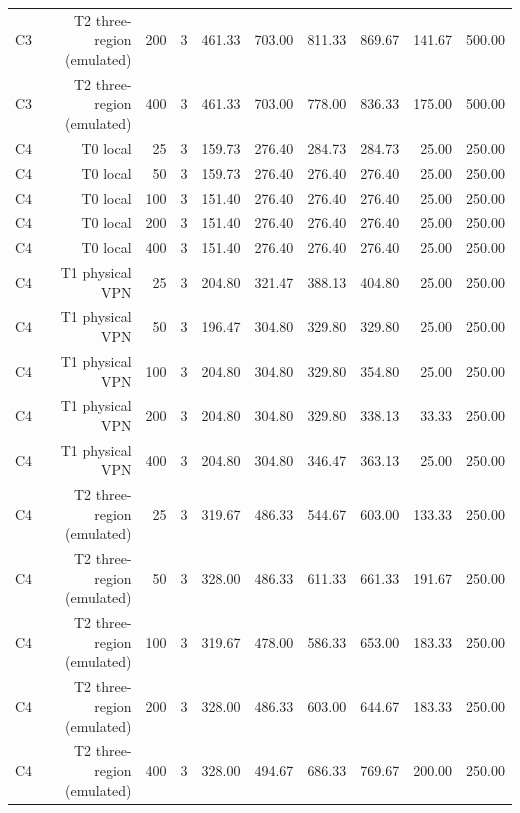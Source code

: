 \begin{table}[t]
\begin{tabular}{lrrrrrrrrr}
C3 & T2 three-region (emulated) & 200 & 3 & 461.33 & 703.00 & 811.33 & 869.67 & 141.67 & 500.00 \\
C3 & T2 three-region (emulated) & 400 & 3 & 461.33 & 703.00 & 778.00 & 836.33 & 175.00 & 500.00 \\
C4 & T0 local & 25 & 3 & 159.73 & 276.40 & 284.73 & 284.73 & 25.00 & 250.00 \\
C4 & T0 local & 50 & 3 & 159.73 & 276.40 & 276.40 & 276.40 & 25.00 & 250.00 \\
C4 & T0 local & 100 & 3 & 151.40 & 276.40 & 276.40 & 276.40 & 25.00 & 250.00 \\
C4 & T0 local & 200 & 3 & 151.40 & 276.40 & 276.40 & 276.40 & 25.00 & 250.00 \\
C4 & T0 local & 400 & 3 & 151.40 & 276.40 & 276.40 & 276.40 & 25.00 & 250.00 \\
C4 & T1 physical VPN & 25 & 3 & 204.80 & 321.47 & 388.13 & 404.80 & 25.00 & 250.00 \\
C4 & T1 physical VPN & 50 & 3 & 196.47 & 304.80 & 329.80 & 329.80 & 25.00 & 250.00 \\
C4 & T1 physical VPN & 100 & 3 & 204.80 & 304.80 & 329.80 & 354.80 & 25.00 & 250.00 \\
C4 & T1 physical VPN & 200 & 3 & 204.80 & 304.80 & 329.80 & 338.13 & 33.33 & 250.00 \\
C4 & T1 physical VPN & 400 & 3 & 204.80 & 304.80 & 346.47 & 363.13 & 25.00 & 250.00 \\
C4 & T2 three-region (emulated) & 25 & 3 & 319.67 & 486.33 & 544.67 & 603.00 & 133.33 & 250.00 \\
C4 & T2 three-region (emulated) & 50 & 3 & 328.00 & 486.33 & 611.33 & 661.33 & 191.67 & 250.00 \\
C4 & T2 three-region (emulated) & 100 & 3 & 319.67 & 478.00 & 586.33 & 653.00 & 183.33 & 250.00 \\
C4 & T2 three-region (emulated) & 200 & 3 & 328.00 & 486.33 & 603.00 & 644.67 & 183.33 & 250.00 \\
C4 & T2 three-region (emulated) & 400 & 3 & 328.00 & 494.67 & 686.33 & 769.67 & 200.00 & 250.00 \\
\hline
\end{tabular}
\end{table}
